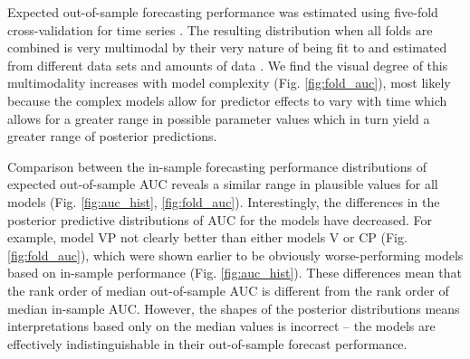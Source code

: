 \documentclass[12pt,letterpaper]{article}
\begin{document}
\begin{refsection}
Expected out-of-sample forecasting performance was estimated using five-fold cross-validation for time series \citep{Arlot2010,Bergmeir2016}. The resulting distribution when all folds are combined is very multimodal by their very nature of being fit to and estimated from different data sets and amounts of data \citep{ESL}. We find the visual degree of this multimodality increases with model complexity (Fig. \ref{fig:fold_auc}), most likely because the complex models allow for predictor effects to vary with time which allows for a greater range in possible parameter values which in turn yield a greater range of posterior predictions.

Comparison between the in-sample forecasting performance distributions of expected out-of-sample AUC reveals a similar range in plausible values for all models (Fig. \ref{fig:auc_hist}, \ref{fig:fold_auc}). Interestingly, the differences in the posterior predictive distributions of AUC for the models have decreased. For example, model VP not clearly better than either models V or CP (Fig. \ref{fig:fold_auc}), which were shown earlier to be obviously worse-performing models based on in-sample performance (Fig. \ref{fig:auc_hist}). These differences mean that the rank order of median out-of-sample AUC is different from the rank order of median in-sample AUC. However, the shapes of the posterior distributions means interpretations based only on the median values is incorrect -- the models are effectively indistinguishable in their out-of-sample forecast performance.



\end{refsection}
\end{document}
